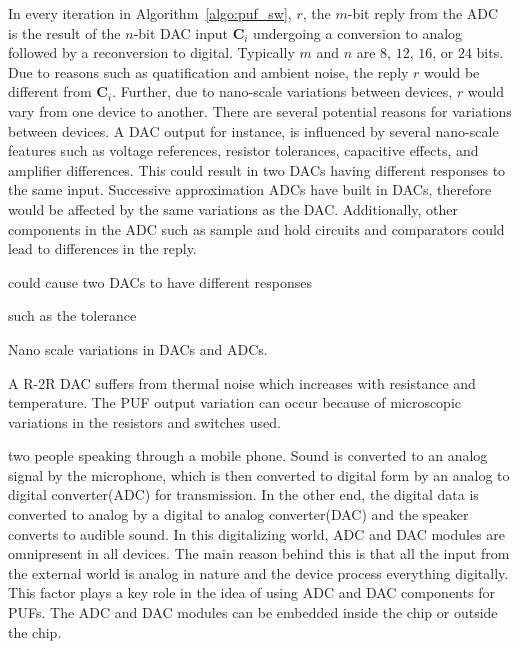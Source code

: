 In every iteration in Algorithm~\ref{algo:puf_sw}, $r$, the $m$-bit reply from 
the ADC is the result of the $n$-bit DAC input $\mathbf C_i$
undergoing a conversion to analog followed by a reconversion to digital.
Typically $m$ and $n$ are $8$, $12$, $16$, or $24$ bits. 
Due to reasons such as quatification and ambient noise, the reply
$r$ would be different from $\mathbf C_i$. Further, due to nano-scale
variations between devices, $r$ would vary from one device
to another.  There are several potential reasons for variations 
between devices.
A DAC output for instance, is influenced by several nano-scale features such 
as voltage references, resistor tolerances, 
capacitive effects, and amplifier differences. This could result 
in two DACs having different responses to the same input. 
Successive approximation ADCs have built in DACs, therefore
would be affected by the same variations as the DAC. Additionally,
other components in the ADC such as sample and hold circuits and
comparators could lead to differences in the reply.








 could cause two DACs to have different responses


 such as the tolerance 


Nano scale variations in DACs and ADCs.





A R-2R DAC suffers from thermal noise which increases with resistance and temperature. The PUF output variation can occur because of microscopic variations in the resistors and switches used.


two people speaking through a mobile phone. Sound is converted to an analog signal by the microphone, which is
then converted to digital form by an analog to digital converter(ADC) for transmission. In the other end, the digital
data is converted to analog by a digital to analog converter(DAC) and the speaker converts to audible sound. In this
digitalizing world, ADC and DAC modules are omnipresent in all devices. The main reason behind this is that all the input from
the external world is analog in nature and the device process everything digitally. This factor plays a key role in
the idea of using ADC and DAC components for PUFs. The ADC and DAC modules can be embedded inside the chip or outside the chip.


